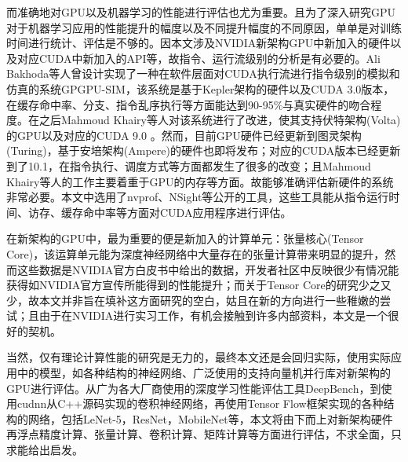 \par 而准确地对GPU以及机器学习的性能进行评估也尤为重要。且为了深入研究GPU对于机器学习应用的性能提升的幅度以及不同提升幅度的不同原因，单单是对训练时间进行统计、评估是不够的。因本文涉及NVIDIA新架构GPU中新加入的硬件以及对应CUDA中新加入的API等，故指令、运行流级别的分析是有必要的。Ali Bakhoda等人曾设计实现了一种在软件层面对CUDA执行流进行指令级别的模拟和仿真的系统GPGPU-SIM，该系统是基于Kepler架构的硬件以及CUDA 3.0版本，在缓存命中率、分支、指令乱序执行等方面能达到90-95\%与真实硬件的吻合程度\parencite{GPGPUSIM}。在之后Mahmoud Khairy等人对该系统进行了改进，使其支持伏特架构(Volta)的GPU以及对应的CUDA 9.0 \parencite{GPGPUSIM2}。然而，目前GPU硬件已经更新到图灵架构(Turing)，基于安培架构(Ampere)的硬件也即将发布；对应的CUDA版本已经更新到了10.1，在指令执行、调度方式等方面都发生了很多的改变；且Mahmoud Khairy等人的工作主要着重于GPU的内存等方面。故能够准确评估新硬件的系统非常必要。本文中选用了nvprof、NSight等公开的工具，这些工具能从指令运行时间、访存、缓存命中率等方面对CUDA应用程序进行评估\parencite{NSIGHT}。
\par 在新架构的GPU中，最为重要的便是新加入的计算单元：张量核心(Tensor Core)，该运算单元能为深度神经网络中大量存在的张量计算带来明显的提升\parencite{VOLTAWHITEPAPER}，然而这些数据是NVIDIA官方白皮书中给出的数据，开发者社区中反映很少有情况能获得如NVIDIA官方宣传所能得到的性能提升；而关于Tensor Core的研究少之又少，故本文并非旨在填补这方面研究的空白，姑且在新的方向进行一些稚嫩的尝试；且由于在NVIDIA进行实习工作，有机会接触到许多内部资料，本文是一个很好的契机。
\par 当然，仅有理论计算性能的研究是无力的，最终本文还是会回归实际，使用实际应用中的模型，如各种结构的神经网络、广泛使用的支持向量机并行库对新架构的GPU进行评估。从广为各大厂商使用的深度学习性能评估工具DeepBench\parencite{DEEPBENCH}，到使用cudnn从C++源码实现的卷积神经网络，再使用Tensor Flow框架实现的各种结构的网络，包括LeNet-5\parencite{LENET}，ResNet\parencite{RESNET}，MobileNet\parencite{MOBILE}等，本文将由下而上对新架构硬件再浮点精度计算、张量计算、卷积计算、矩阵计算等方面进行评估，不求全面，只求能给出启发。


